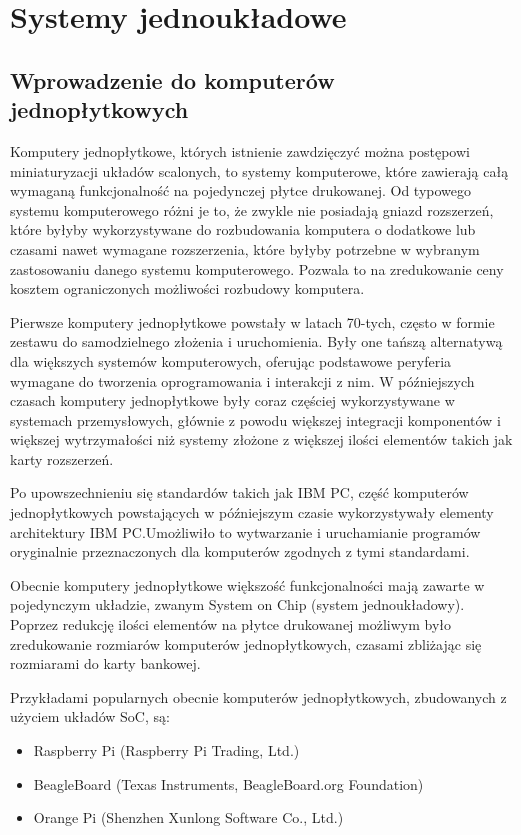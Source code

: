 \section{Systemy jednoukładowe}

\subsection{Wprowadzenie do komputerów jednopłytkowych}

Komputery jednopłytkowe, których istnienie zawdzięczyć można postępowi miniaturyzacji układów scalonych, to systemy komputerowe, które zawierają całą wymaganą funkcjonalność na pojedynczej płytce drukowanej. Od typowego systemu komputerowego różni je to, że zwykle nie posiadają gniazd rozszerzeń, które byłyby wykorzystywane do rozbudowania komputera o dodatkowe lub czasami nawet wymagane rozszerzenia, które byłyby potrzebne w wybranym zastosowaniu danego systemu komputerowego. Pozwala to na zredukowanie ceny kosztem ograniczonych możliwości rozbudowy komputera.

Pierwsze komputery jednopłytkowe powstały w latach 70-tych\cite{Ariza_2021}, często w formie zestawu do samodzielnego złożenia i uruchomienia. Były one tańszą alternatywą dla większych systemów komputerowych, oferując podstawowe peryferia wymagane do tworzenia oprogramowania i interakcji z nim.
W późniejszych czasach komputery jednopłytkowe były coraz częściej wykorzystywane w systemach przemysłowych, głównie z powodu większej integracji komponentów i większej wytrzymałości niż systemy złożone z większej ilości elementów takich jak karty rozszerzeń.

Po upowszechnieniu się standardów takich jak IBM PC, część komputerów jednopłytkowych powstających w późniejszym czasie wykorzystywały elementy architektury IBM PC.Umożliwiło to wytwarzanie i uruchamianie programów oryginalnie przeznaczonych dla komputerów zgodnych z tymi standardami.

Obecnie komputery jednopłytkowe większość funkcjonalności mają zawarte w pojedynczym układzie, zwanym System on Chip (system jednoukładowy). Poprzez redukcję ilości elementów na płytce drukowanej możliwym było zredukowanie rozmiarów komputerów jednopłytkowych, czasami zbliżając się rozmiarami do karty bankowej.

Przykładami popularnych obecnie komputerów jednopłytkowych, zbudowanych z użyciem układów SoC, są:
\begin{itemize}
	\item Raspberry Pi (Raspberry Pi Trading, Ltd.)
	\item BeagleBoard (Texas Instruments, BeagleBoard.org Foundation)
	\item Orange Pi (Shenzhen Xunlong Software Co., Ltd.)
\end{itemize}

